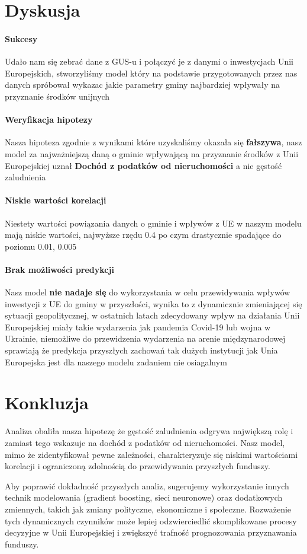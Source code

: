 \documentclass[12pt]{article}
\begin{document}
\section{Dyskusja}
\paragraph{Sukcesy} 
Udało nam się zebrać dane z GUS-u i połączyć je z danymi o inwestycjach Unii Europejskich, stworzyliśmy model który na podstawie 
przygotowanych przez nas danych spróbował wykazac jakie parametry gminy najbardziej wpływały na przyznanie środków unijnych 
\paragraph{Weryfikacja hipotezy}
Nasza hipoteza zgodnie z wynikami które uzyskaliśmy okazała się \textbf{fałszywa}, nasz model za najważniejszą daną o gminie wpływającą
na przyznanie środków z Unii Europejskiej uznał \textbf{Dochód z podatków od nieruchomości} a nie gęstość zaludnienia 
\paragraph{Niskie wartości korelacji}
Niestety wartości powiązania danych o gminie i wpływów z UE w naszym modelu mają niskie wartości, 
najwyższe rzędu 0.4 po czym drastycznie spadające do poziomu 0.01, 0.005 \\ 
\paragraph{Brak możliwości predykcji}
Nasz model \textbf{nie nadaje się} do wykorzystania w celu przewidywania wpływów inwestycji z UE do gminy w przyszłości, 
wynika to z dynamicznie zmieniającej się sytuacji geopolitycznej, w ostatnich latach zdecydowany wpływ na działania Unii Europejskiej miały 
takie wydarzenia jak pandemia Covid-19 lub wojna w Ukrainie, niemożliwe do przewidzenia wydarzenia na arenie międzynarodowej sprawiają że 
predykcja przyszłych zachowań tak dużych instytucji jak Unia Europejska jest dla naszego modelu zadaniem nie osiagalnym 

\section{Konkluzja}
Analiza obaliła nasza hipotezę że gęstość zaludnienia odgrywa największą rolę i zamiast tego wskazuje na dochód z podatków od nieruchomości.
Nasz model, mimo że zidentyfikował pewne zależności, charakteryzuje się niskimi wartościami korelacji i ograniczoną zdolnością do przewidywania przyszłych funduszy.

Aby poprawić dokładność przyszłych analiz, sugerujemy wykorzystanie innych technik modelowania (gradient boosting, sieci neuronowe)
oraz dodatkowych zmiennych, takich jak zmiany polityczne, ekonomiczne i społeczne. Rozważenie tych dynamicznych czynników może lepiej
odzwierciedlić skomplikowane procesy decyzyjne w Unii Europejskiej i zwiększyć trafność prognozowania przyznawania funduszy.


\end{document}
